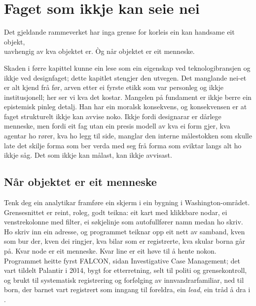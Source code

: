 \chapter{Faget som ikkje kan seie nei}

\begin{motto}
Det gjeldande rammeverket har inga grense for korleis ein kan handsame eit objekt,\\ uavhengig av kva objektet er. Òg når objektet er eit menneske.
\end{motto}

Skaden i førre kapittel kunne ein lese som ein eigenskap ved teknologibransjen og ikkje ved designfaget; dette kapitlet stengjer den utvegen. Det manglande nei-et er alt kjend frå før, arven etter ei fyrste etikk som var personleg og ikkje institusjonell; her ser vi kva det kostar. Mangelen på fundament er ikkje berre ein epistemisk pinleg detalj. Han har ein moralsk konsekvens, og konsekvensen er at faget strukturelt ikkje kan avvise noko. Ikkje fordi designarar er dårlege menneske, men fordi eit fag utan ein presis modell av kva ei form gjer, kva agentar ho rører, kva ho legg til side, manglar den interne målestokken som skulle late det skilje forma som ber verda med seg frå forma som sviktar langs alt ho ikkje såg. Det som ikkje kan målast, kan ikkje avvisast.


\section{Når objektet er eit menneske}

Tenk deg ein analytikar framføre ein skjerm i ein bygning i Washington-området. Grensesnittet er reint, roleg, godt teikna: eit kart med klikkbare nodar, ei venstrekolonne med filter, ei søkjelinje som autofullfører namn medan ho skriv. Ho skriv inn ein adresse, og programmet teiknar opp eit nett av samband, kven som bur der, kven dei ringjer, kva bilar som er registrerte, kva skular borna går på. Kvar node er eit menneske. Kvar line er eit høve til å hente nokon. Programmet heitte fyrst FALCON, sidan Investigative Case Management; det vart tildelt Palantir i 2014, bygt for etterretning, selt til politi og grensekontroll, og brukt til systematisk registrering og forfølging av innvandrarfamiliar, ned til born, der barnet vart registrert som inngang til foreldra, ein \emph{lead}, ein tråd å dra i \autocite{biddle_intercept}.

